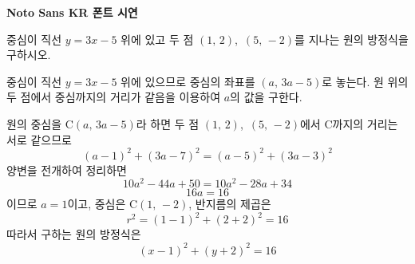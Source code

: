 \documentclass[10pt]{article}
\begin{document}
\begin{center}\bfseries\fontsize{14}{16}\selectfont [샘플] Noto Sans KR 폰트 시연\end{center}
\vspace{5mm}


\begin{dmproblem}
중심이 직선 $y = 3x - 5$ 위에 있고 두 점 $(1,\, 2)$,\ $(5,\, -2)$를 지나는 원의 방정식을 구하시오.
\end{dmproblem}

\begin{dmapproach}
중심이 직선 $y = 3x - 5$ 위에 있으므로 중심의 좌표를 $(a,\, 3a - 5)$로 놓는다. 원 위의 두 점에서 중심까지의 거리가 같음을 이용하여 $a$의 값을 구한다.
\end{dmapproach}

\begin{dmsolution}
원의 중심을 $\mathrm{C}(a,\, 3a - 5)$라 하면 두 점 $(1,\, 2)$,\ $(5,\, -2)$에서 $\mathrm{C}$까지의 거리는 서로 같으므로
\begin{equation*}
  (a - 1)^2 + (3a - 7)^2 = (a - 5)^2 + (3a - 3)^2
\end{equation*}
양변을 전개하여 정리하면
\begin{equation*}
  10a^2 - 44a + 50 = 10a^2 - 28a + 34
\end{equation*}
\begin{equation*}
  16a = 16
\end{equation*}
이므로 $a = 1$이고, 중심은 $\mathrm{C}(1,\, -2)$, 반지름의 제곱은
\begin{equation*}
  r^2 = (1 - 1)^2 + (2 + 2)^2 = 16
\end{equation*}
따라서 구하는 원의 방정식은
\begin{equation*}
  (x - 1)^2 + (y + 2)^2 = 16
\end{equation*}
\end{dmsolution}
\end{document}
